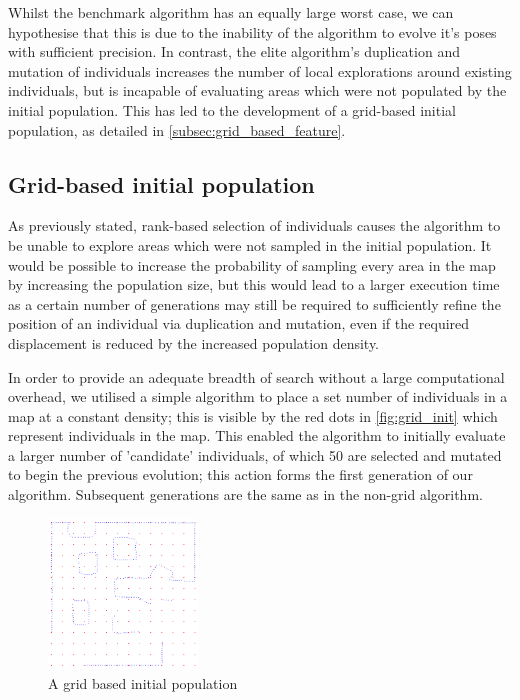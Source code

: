 \documentclass[authoryearcitations]{UoYCSproject}
\begin{document}
Whilst the benchmark algorithm has an equally large worst case, we can hypothesise that this is due to the inability of the algorithm to evolve it's poses with sufficient precision. In contrast, the elite algorithm's duplication and mutation of individuals increases the number of local explorations around existing individuals, but is incapable of evaluating areas which were not populated by the initial population. This has led to the development of a grid-based initial population, as detailed in \autoref{subsec:grid_based_feature}.

\subsection{Grid-based initial population}
\label{subsec:grid_based_feature}
 As previously stated, rank-based selection of individuals causes the algorithm to be unable to explore areas which were not sampled in the initial population. It would be possible to increase the probability of sampling every area in the map by increasing the population size, but this would lead to a larger execution time as a certain number of generations may still be required to sufficiently refine the position of an individual via duplication and mutation, even if the required displacement is reduced by the increased population density.

 In order to provide an adequate breadth of search without a large computational overhead, we utilised a simple algorithm to place a set number of individuals in a map at a constant density; this is visible by the red dots in \autoref{fig:grid_init} which represent individuals in the map. This enabled the algorithm to initially evaluate a larger number of 'candidate' individuals, of which 50 are selected and mutated to begin the previous evolution; this action forms the first generation of our algorithm. Subsequent generations are the same as in the non-grid algorithm. 

\begin{figure}[ht]
\centering
	\includegraphics[width=4cm,keepaspectratio]{images/grid.png}
	\caption{A grid based initial population}
	\label{fig:grid_init}
\end{figure}
\end{document}
